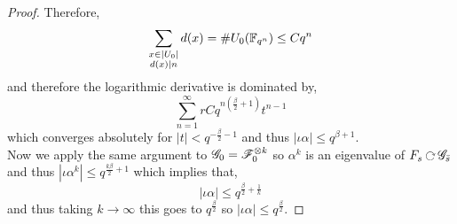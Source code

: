 \documentclass[12pt]{article}
\begin{document}
\begin{proof}
Therefore,
\[ \sum_{\substack{x \in |U_0| \\ d(x) \mid n}} d(x) = \# U_0(\mathbb{F}_{q^n}) \le C q^n \]
and therefore the logarithmic derivative is dominated by,
\[ \sum_{n = 1}^\infty r C q^{n \left( \frac{\beta}{2} + 1 \right)} t^{n-1} \]
which converges absolutely for $|t| < q^{- \frac{\beta}{2} - 1}$ and thus $|\iota \alpha| \le q^{\beta + 1}$. 
\bigskip\\
Now we apply the same argument to $\mathscr{G}_0 = \mathscr{F}_0^{\otimes k}$ so $\alpha^k$ is an eigenvalue of $F_s \acts \G_{\bar{s}}$ and thus $| \iota \alpha^k | \le q^{\frac{k \beta}{2} + 1}$ which implies that,
\[ | \iota \alpha | \le q^{\frac{\beta}{2} + \frac{1}{k}} \]
and thus taking $k \to \infty$ this goes to $q^{\frac{\beta}{2}}$ so $| \iota \alpha| \le q^{\frac{\beta}{2}}$. 
\end{proof}
\end{document}
